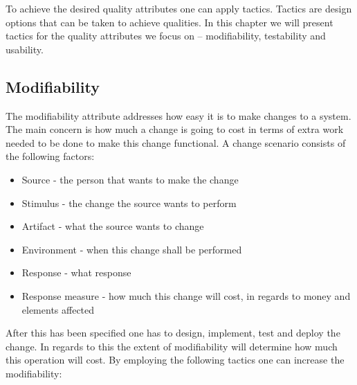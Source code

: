 \label{tactics}
To achieve the desired quality attributes one can apply tactics. Tactics are design options that can be taken to achieve qualities. In this chapter we will present tactics for the quality attributes we focus on -- modifiability, testability and usability.

\subsection{Modifiability}
The modifiability attribute addresses how easy it is to make changes to a system. The main concern is how much a change is going to cost in terms of extra work needed to be done to make this change functional. A change scenario consists of the following factors:

\begin{itemize}
	\item Source - the person that wants to make the change
	\item Stimulus - the change the source wants to perform
	\item Artifact - what the source wants to change
	\item Environment - when this change shall be performed
	\item Response - what response
	\item Response measure - how much this change will cost, in regards to money and elements affected
\end{itemize}

After this has been specified one has to design, implement, test and deploy the change. In regards to this the extent of modifiability will determine how much this operation will cost. By employing the following tactics one can increase the modifiability: 

